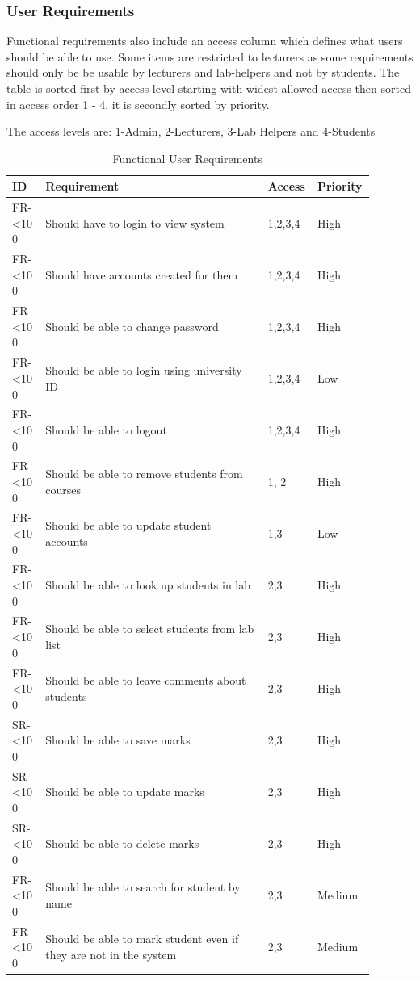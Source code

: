 \documentclass[12pt]{article}  %
\newcommand{\rid}[1]{\centering #1-\ifnum\value{requirement}<10 0\fi\arabic{requirement} \stepcounter{requirement}}
\begin{document}
\def\arraystretch{1.5}
\subsubsection{User Requirements}
Functional requirements also include an access column which defines what users should be able to use. Some items are restricted to lecturers as some requirements should only be be usable by lecturers and lab-helpers and not by students. The table is sorted first by access level starting with widest allowed access then sorted in access order 1 - 4, it is secondly sorted by priority.

The access levels are: 1-Admin, 2-Lecturers, 3-Lab Helpers and 4-Students


\begin{spacing}{1.5}
\begin{longtable}{|p{0.09\linewidth}|p{0.6\linewidth}|p{0.1\linewidth}|
p{0.1\linewidth}|}
\caption{Functional User Requirements} \label{table:funct-user} \\
\hline


\textbf{ID} & \textbf{Requirement} & \textbf{Access} & \textbf{Priority}\\
\hline \hline


\rid{FR} & Should have to login to view system & 1,2,3,4 & High\\ \hline
\rid{FR} & Should have accounts created for them & 1,2,3,4 & High\\ \hline
\rid{FR} & Should be able to change password & 1,2,3,4 & High\\ \hline
\rid{FR} & Should be able to login using university ID & 1,2,3,4 & Low\\ \hline
\rid{FR} & Should be able to logout & 1,2,3,4 & High \\ \hline

\rid{FR} & Should be able to remove students from courses & 1, 2 & High\\ \hline
\rid{FR} & Should be able to update student accounts & 1,3 & Low \\ \hline

\rid{FR} & Should be able to look up students in lab & 2,3 & High\\ \hline
\rid{FR} & Should be able  to select students from lab list & 2,3 & High\\ \hline
\rid{FR} & Should be able to leave comments about students & 2,3 & High\\ \hline
\rid{SR} & Should be able to save marks & 2,3 & High\\ \hline
\rid{SR} & Should be able to update marks & 2,3 & High\\ \hline
\rid{SR} & Should be able to delete marks & 2,3 & High\\ \hline
\rid{FR} & Should be able to search for student by name & 2,3 & Medium\\ \hline
\rid{FR} & Should be able to mark student even if they are not in the system & 2,3 & Medium \\ \hline


\end{longtable}
\end{spacing}
\end{document}
